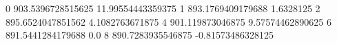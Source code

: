 0 903.5396728515625 11.99554443359375
1 893.1769409179688 1.6328125
2 895.6524047851562 4.1082763671875
4 901.119873046875 9.57574462890625
6 891.5441284179688 0.0
8 890.7283935546875 -0.81573486328125
